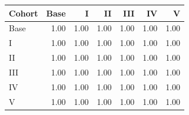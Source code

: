 \begin{tabular}{@{}lrrrrrr@{}}
\toprule
Cohort & Base & I & II & III & IV & V \\
\midrule
Base & 1.00 & 1.00 & 1.00 & 1.00 & 1.00 & 1.00 \\
I & 1.00 & 1.00 & 1.00 & 1.00 & 1.00 & 1.00 \\
II & 1.00 & 1.00 & 1.00 & 1.00 & 1.00 & 1.00 \\
III & 1.00 & 1.00 & 1.00 & 1.00 & 1.00 & 1.00 \\
IV & 1.00 & 1.00 & 1.00 & 1.00 & 1.00 & 1.00 \\
V & 1.00 & 1.00 & 1.00 & 1.00 & 1.00 & 1.00 \\
\bottomrule
\end{tabular}
